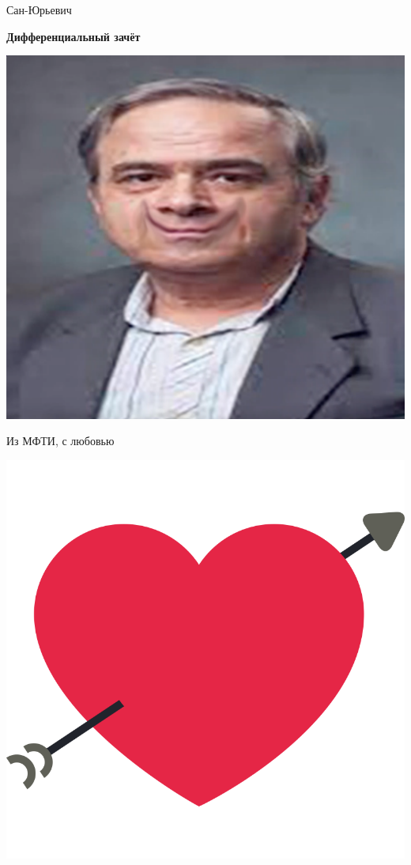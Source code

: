 \documentclass[12pt]{article}
\begin{document}
                                          
\begin{titlepage}                                         
	\begin{center}                                          
		\Huge                                                 
		Сан-Юрьевич                                            
		\vspace*{1cm}                                         
                                                           
		\textbf{Дифференциальный зачёт}                       
                                                           
		\vspace{0.5cm}                                        
		\vspace{1.5cm}                                        
		\includegraphics[width = 10 cm]{imgs/petrovich.png}   
		\begin{minipage}{10cm}                                
			\begin{center}                                      
				Из МФТИ, с любовью                                 
			\end{center}                                        
		\includegraphics[width = 3 cm]{imgs/with_love.png}    
		\end{minipage}                                        
                                                           
	\end{center}                                            
\end{titlepage}                                           
\end{document}
